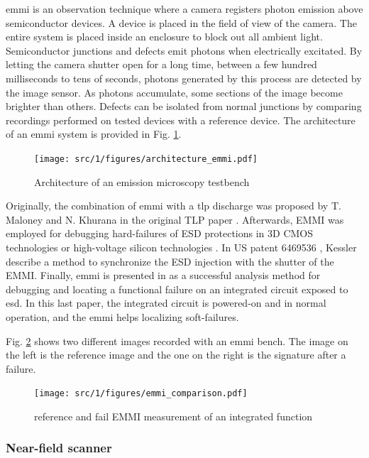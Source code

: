 \gls{emmi} is an observation technique where a camera registers photon emission above semiconductor devices.
A device is placed in the field of view of the camera.
The entire system is placed inside an enclosure to block out all ambient light.
Semiconductor junctions and defects emit photons when electrically excitated.
By letting the camera shutter open for a long time, between a few hundred milliseconds to tens of seconds, photons generated by this process are detected by the image sensor.
As photons accumulate, some sections of the image become brighter than others.
Defects can be isolated from normal junctions by comparing recordings performed on tested devices with a reference device.
The architecture of an \gls{emmi} system is provided in Fig. \ref{fig:emmi}.

\begin{figure}[!h]
  \centering
  \texttt{[image: src/1/figures/architecture\_emmi.pdf]}
  \caption{Architecture of an emission microscopy testbench}
  \label{fig:emmi}
\end{figure}

Originally, the combination of \gls{emmi} with a \gls{tlp} discharge was proposed by T. Maloney and N. Khurana in the original TLP paper \cite{TLP}.
Afterwards, EMMI was employed for debugging hard-failures of ESD protections in 3D CMOS technologies \cite{kessler2002method} or high-voltage silicon technologies \cite{emmi-tlp}.
In US patent 6469536 \cite{kessler2002method}, Kessler describe a method to synchronize the ESD injection with the shutter of the EMMI.
Finally, \gls{emmi} is presented in \cite{softfailEMMI} as a successful analysis method for debugging and locating a functional failure on an integrated circuit exposed to \gls{esd}.
In this last paper, the integrated circuit is powered-on and in normal operation, and the \gls{emmi} helps localizing soft-failures.

Fig. \ref{fig:emmi-examples} shows two different images recorded with an \gls{emmi} bench.
The image on the left is the reference image and the one on the right is the signature after a failure.

\begin{figure}[!h]
  \centering
  \texttt{[image: src/1/figures/emmi\_comparison.pdf]}
  \caption{reference and fail EMMI measurement of an integrated function}
  \label{fig:emmi-examples}
\end{figure}

\subsubsection{Near-field scanner}
\label{sec:near-field-scan}

